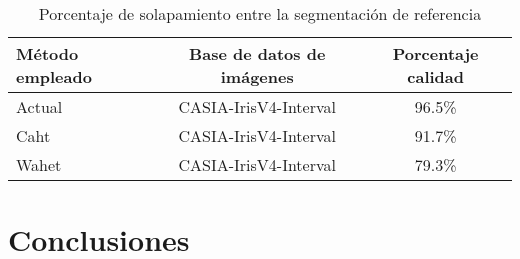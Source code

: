 \begin{table}[h]
\begin{center}
\begin{tabular}{@{}lcc@{}}
\toprule
Método empleado		& Base de datos de imágenes 		& Porcentaje calidad \\ \hline
Actual 			& CASIA-IrisV4-Interval		& 96.5\% \\
Caht 			& CASIA-IrisV4-Interval		& 91.7\% \\
Wahet  		& CASIA-IrisV4-Interval		& 79.3\% \\
\end{tabular}
\end{center}
\caption{Porcentaje de solapamiento entre la segmentación de referencia}
\label{my_tabla}
\end{table}

\begin{table}[htbp]
\begin{center}
\end{center}
\end{table}

\section{Conclusiones}

